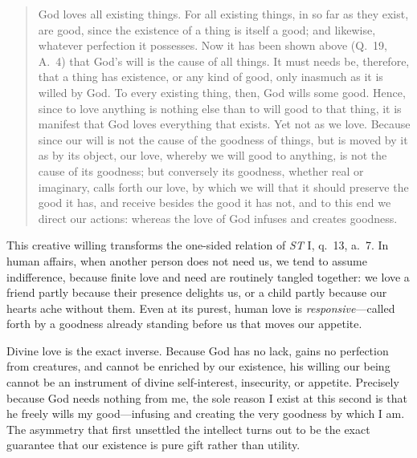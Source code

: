 \begin{quote}
God loves all existing things. For all existing things, in so far as they exist, are good, since the existence of a thing is itself a good; and likewise, whatever perfection it possesses. Now it has been shown above (Q.\ 19, A.\ 4) that God's will is the cause of all things. It must needs be, therefore, that a thing has existence, or any kind of good, only inasmuch as it is willed by God. To every existing thing, then, God wills some good. Hence, since to love anything is nothing else than to will good to that thing, it is manifest that God loves everything that exists. Yet not as we love. Because since our will is not the cause of the goodness of things, but is moved by it as by its object, our love, whereby we will good to anything, is not the cause of its goodness; but conversely its goodness, whether real or imaginary, calls forth our love, by which we will that it should preserve the good it has, and receive besides the good it has not, and to this end we direct our actions: whereas the love of God infuses and creates goodness.
\end{quote}

This creative willing transforms the one-sided relation of \emph{ST} I, q.\ 13, a.\ 7. In human affairs, when another person does not need us, we tend to assume indifference, because finite love and need are routinely tangled together: we love a friend partly because their presence delights us, or a child partly because our hearts ache without them. Even at its purest, human love is \emph{responsive}---called forth by a goodness already standing before us that moves our appetite.

Divine love is the exact inverse. Because God has no lack, gains no perfection from creatures, and cannot be enriched by our existence, his willing our being cannot be an instrument of divine self-interest, insecurity, or appetite. Precisely because God needs nothing from me, the sole reason I exist at this second is that he freely wills my good---infusing and creating the very goodness by which I am. The asymmetry that first unsettled the intellect turns out to be the exact guarantee that our existence is pure gift rather than utility.


